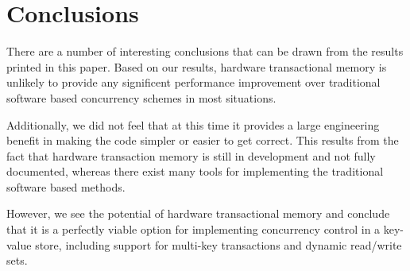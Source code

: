 \section{Conclusions} \label{sec:conclusion}

There are a number of interesting conclusions that can be drawn from the 
results printed in this paper. Based on our results, hardware transactional 
memory is unlikely to provide any significent performance improvement over 
traditional software based concurrency schemes in most situations.

Additionally, we did not feel that at this time it provides a large engineering 
benefit in making the code simpler or easier to get correct. This results from the 
fact that hardware transaction memory is still in development and not fully 
documented, whereas there exist many tools for implementing the traditional 
software based methods.

However, we see the potential of hardware transactional memory and conclude 
that it is a perfectly viable option for implementing concurrency control in 
a key-value store, including support for multi-key transactions and dynamic 
read/write sets.
